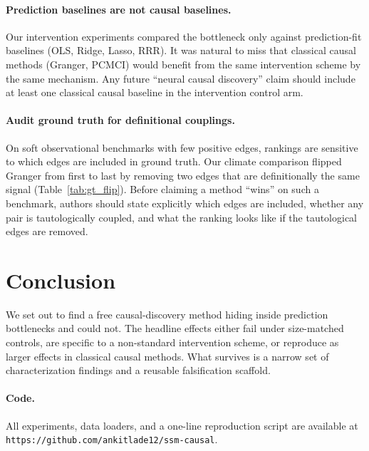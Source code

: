 \documentclass{article}
\begin{document}
\paragraph{Prediction baselines are not causal baselines.} Our
intervention experiments compared the bottleneck only against
prediction-fit baselines (OLS, Ridge, Lasso, RRR). It was natural to
miss that classical causal methods (Granger, PCMCI) would benefit from
the same intervention scheme by the same mechanism. Any future
``neural causal discovery'' claim should include at least one classical
causal baseline in the intervention control arm.

\paragraph{Audit ground truth for definitional couplings.} On soft
observational benchmarks with few positive edges, rankings are
sensitive to which edges are included in ground truth. Our climate
comparison flipped Granger from first to last by removing two edges
that are definitionally the same signal (Table~\ref{tab:gt_flip}).
Before claiming a method ``wins'' on such a benchmark, authors
should state explicitly which edges are included, whether any pair
is tautologically coupled, and what the ranking looks like if the
tautological edges are removed.

\section{Conclusion}

We set out to find a free causal-discovery method hiding inside
prediction bottlenecks and could not. The headline effects either fail
under size-matched controls, are specific to a non-standard intervention
scheme, or reproduce as larger effects in classical causal methods. What
survives is a narrow set of characterization findings and a reusable
falsification scaffold.

\paragraph{Code.} All experiments, data loaders, and a one-line
reproduction script are available at
\texttt{https://github.com/ankitlade12/ssm-causal}.



\end{document}
